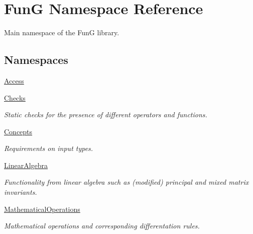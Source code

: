 \hypertarget{namespaceFunG}{}\section{FunG Namespace Reference}
\label{namespaceFunG}


Main namespace of the FunG library.  


\subsection*{Namespaces}
\begin{DoxyCompactItemize}
\item 
 \hyperlink{namespaceFunG_1_1Access}{Access}
\item 
 \hyperlink{namespaceFunG_1_1Checks}{Checks}
\begin{DoxyCompactList}\small\item\em Static checks for the presence of different operators and functions. \end{DoxyCompactList}\item 
 \hyperlink{namespaceFunG_1_1Concepts}{Concepts}
\begin{DoxyCompactList}\small\item\em Requirements on input types. \end{DoxyCompactList}\item 
 \hyperlink{namespaceFunG_1_1LinearAlgebra}{Linear\+Algebra}
\begin{DoxyCompactList}\small\item\em Functionality from linear algebra such as (modified) principal and mixed matrix invariants. \end{DoxyCompactList}\item 
 \hyperlink{namespaceFunG_1_1MathematicalOperations}{Mathematical\+Operations}
\begin{DoxyCompactList}\small\item\em Mathematical operations and corresponding differentation rules. \end{DoxyCompactList}\end{DoxyCompactItemize}
